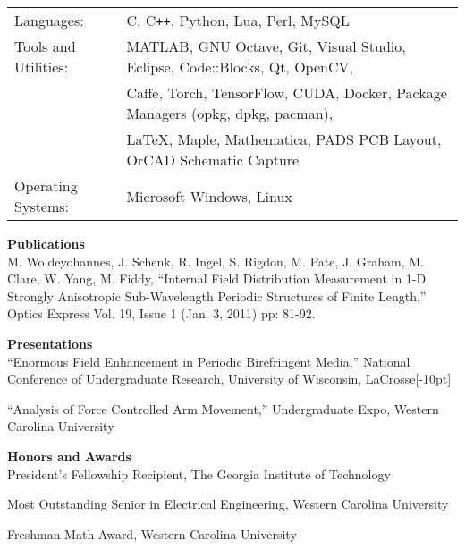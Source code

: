 \documentclass[14pt,letterpaper]{extarticle}
\begin{document}
\medskip\noindent
\begin{tabularx}{\linewidth}{@{}lL@{}}
\footnotesize{Languages:} & \footnotesize{C, C\texttt{++}, Python, Lua, Perl, MySQL}\vspace{0.5mm}\\
\footnotesize{Tools and Utilities:} & \footnotesize{MATLAB, GNU Octave, Git, Visual Studio, Eclipse, Code::Blocks, Qt, OpenCV,}\\
                                    & \footnotesize{Caffe, Torch, TensorFlow, CUDA, Docker, Package Managers (opkg, dpkg, pacman),}\\
                                    & \footnotesize{\LaTeX, Maple, Mathematica, PADS PCB Layout, OrCAD Schematic Capture}\vspace{0.5mm}\\
\footnotesize{Operating Systems:}   & \footnotesize{Microsoft Windows, Linux}\\
\end{tabularx}

\bigskip
\noindent\textbf{\large{Publications}}\vspace{5.3pt}\\
\noindent
\footnotesize{M. Woldeyohannes, J. Schenk, R. Ingel, S. Rigdon, M. Pate, J. Graham, M. Clare, W. Yang, M. Fiddy, ``Internal Field Distribution Measurement in 1-D Strongly Anisotropic Sub-Wavelength Periodic Structures of Finite Length,'' Optics Express Vol. 19, Issue 1 (Jan. 3, 2011) pp: 81-92.}

\bigskip
\noindent\textbf{\large{Presentations}}\vspace{5.3pt}\\
\footnotesize{``Enormous  Field  Enhancement  in  Periodic  Birefringent Media,''
National Conference of Undergraduate Research, University of Wisconsin, LaCrosse}[-10pt]

\medskip\noindent
\footnotesize{``Analysis of Force Controlled Arm Movement,'' Undergraduate Expo, Western Carolina University}

\bigskip
\noindent\textbf{\large{Honors and Awards}}\vspace{5.3pt}\\
\noindent\footnotesize{President's Fellowship Recipient, The Georgia Institute of Technology}

\medskip
\noindent\footnotesize{Most Outstanding Senior in Electrical Engineering, Western Carolina University}

\medskip
\noindent\footnotesize{Freshman Math Award, Western Carolina University}
\end{document}
